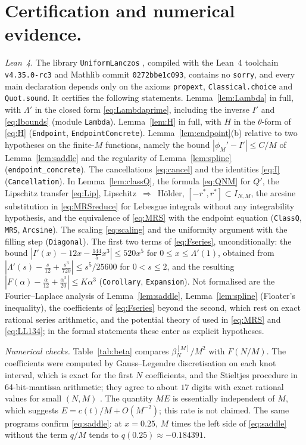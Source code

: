 \documentclass{math}
\newcommand{\lean}[1]{\texttt{#1}}
\begin{document}
\section{Certification and numerical evidence.}\label{sec:cert}
\emph{Lean~4.} The library \lean{UniformLanczos} \cite{alfano2026cert}, compiled with the Lean~4 toolchain \lean{v4.35.0-rc3} and Mathlib commit \lean{0272bbe1c093}, contains no \lean{sorry}, and every main declaration depends only on the axioms \lean{propext}, \lean{Classical.choice} and \lean{Quot.sound}. It certifies the following statements. Lemma~\ref{lem:Lambda} in full, with $\Lambda'$ in the closed form \eqref{eq:Lambdaprime}, including the inverse $I'$ and \eqref{eq:Ibounds} (module \lean{Lambda}). Lemma~\ref{lem:H} in full, with $H$ in the $\theta$-form of \eqref{eq:H} (\lean{Endpoint}, \lean{EndpointConcrete}). Lemma~\ref{lem:endpoint}(b) relative to two hypotheses on the finite-$M$ functions, namely the bound $|\phi_M'-I'|\le C/M$ of Lemma~\ref{lem:saddle} and the regularity of Lemma~\ref{lem:spline} (\lean{endpoint\_concrete}). The cancellations \eqref{eq:cancel} and the identities \eqref{eq:I} (\lean{Cancellation}). In Lemma~\ref{lem:classQ}, the formula \eqref{eq:QNM} for $Q'$, the Lipschitz transfer \eqref{eq:Lip}, Lipschitz~$\Rightarrow$~H\"older, $[-r^*,r^*]\subset I_{N,M}$, the arcsine substitution in \eqref{eq:MRSreduce} for Lebesgue integrals without any integrability hypothesis, and the equivalence of \eqref{eq:MRS} with the endpoint equation (\lean{ClassQ}, \lean{MRS}, \lean{Arcsine}). The scaling \eqref{eq:scaling} and the uniformity argument with the filling step (\lean{Diagonal}). The first two terms of \eqref{eq:Fseries}, unconditionally: the bound $|I'(x)-12x-\frac{144}5x^3|\le520x^5$ for $0\le x\le\Lambda'(1)$, obtained from $|\Lambda'(s)-\frac s{12}+\frac{s^3}{720}|\le s^5/25600$ for $0<s\le2$, and the resulting $|F(\alpha)-\frac\alpha{12}+\frac{\alpha^2}{20}|\le K\alpha^3$ (\lean{Corollary}, \lean{Expansion}). Not formalised are the Fourier--Laplace analysis of Lemma~\ref{lem:saddle}, Lemma~\ref{lem:spline} (Floater's inequality), the coefficients of \eqref{eq:Fseries} beyond the second, which rest on exact rational series arithmetic, and the potential theory of \cite{levinlubinsky2018} used in \eqref{eq:MRS} and \eqref{eq:LL134}; in the formal statements these enter as explicit hypotheses.

\emph{Numerical checks.} Table~\ref{tab:beta} compares $\beta_N^{[M]}/M^2$ with $F(N/M)$. The coefficients were computed by Gauss--Legendre discretisation on each knot interval, which is exact for the first $N$ coefficients, and the Stieltjes procedure in 64-bit-mantissa arithmetic; they agree to about $17$ digits with exact rational values for small $(N,M)$ \cite{alfano2026cert}. The quantity $ME$ is essentially independent of $M$, which suggests $E=c(t)/M+O(M^{-2})$; this rate is not claimed. The same programs confirm \eqref{eq:saddle}: at $x=0.25$, $M$ times the left side of \eqref{eq:saddle} without the term $q/M$ tends to $q(0.25)\approx-0.184391$.
\end{document}
